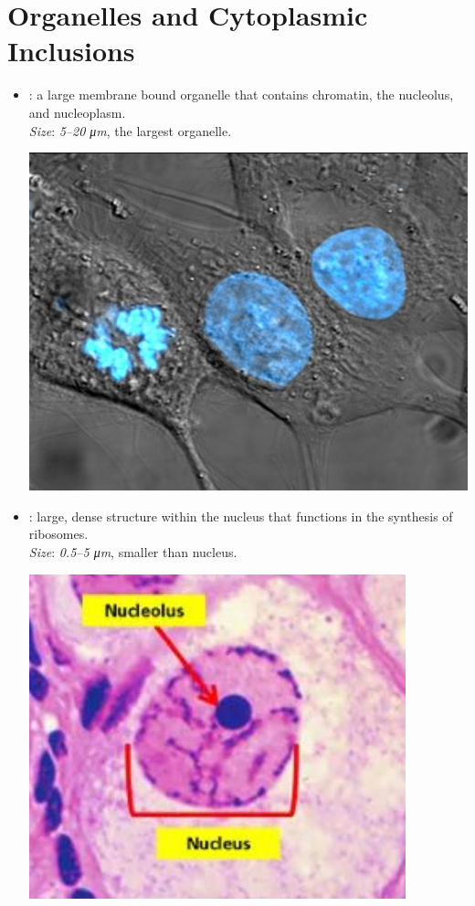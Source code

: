 \section{Organelles and Cytoplasmic Inclusions}
\begin{multicols}{2}
\begin{itemize}
  \item {}: a large membrane bound organelle that contains chromatin, the nucleolus, and nucleoplasm. \\ 
  \textit{Size}: \emph{5--20 \si{\micro m}}, the largest organelle. \\
  \begin{center}
    \hspace{-30pt}\includegraphics[width=0.65\columnwidth]{images/week-1-nucleus.jpg}
  \end{center}
  \item {}: large, dense structure within the nucleus that functions in the synthesis of ribosomes. \\
  \textit{Size}: \emph{0.5--5 \si{\micro m}}, smaller than nucleus.
  \begin{center}
    \hspace{-30pt}\includegraphics[width=0.65\columnwidth]{images/week-1-nucleolus.jpg}

\end{center}
\end{itemize}
\end{multicols}

